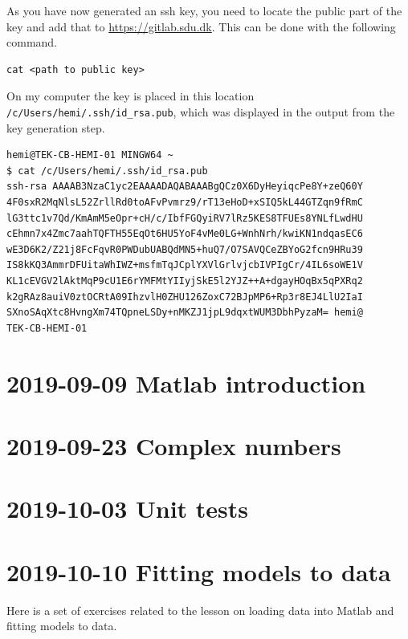 \documentclass[12pt,a4paper]{article}
\newcounter{ex}
\numberwithin{ex}{section}
\begin{document}
As you have now generated an ssh key, you need to locate the 
public part of the key and add that to \url{https://gitlab.sdu.dk}.
This can be done with the following command.
\begin{verbatim}
cat <path to public key>
\end{verbatim}

On my computer the key is placed in this location 
\verb!/c/Users/hemi/.ssh/id_rsa.pub!, which was displayed 
in the output from the key generation step.

\begin{verbatim}
hemi@TEK-CB-HEMI-01 MINGW64 ~
$ cat /c/Users/hemi/.ssh/id_rsa.pub
ssh-rsa AAAAB3NzaC1yc2EAAAADAQABAAABgQCz0X6DyHeyiqcPe8Y+zeQ60Y
4F0sxR2MqNlsL52ZrllRd0toAFvPvmrz9/rT13eHoD+xSIQ5kL44GTZqn9fRmC
lG3ttc1v7Qd/KmAmM5eOpr+cH/c/IbfFGQyiRV7lRz5KES8TFUEs8YNLfLwdHU
cEhmn7x4Zmc7aahTQFTH55EqOt6HU5YoF4vMe0LG+WnhNrh/kwiKN1ndqasEC6
wE3D6K2/Z21j8FcFqvR0PWDubUABQdMN5+huQ7/O7SAVQCeZBYoG2fcn9HRu39
IS8kKQ3AmmrDFUitaWhIWZ+msfmTqJCplYXVlGrlvjcbIVPIgCr/4IL6soWE1V
KL1cEVGV2lAktMqP9cU1E6rYMFMtYIIyjSkE5l2YJZ++A+dgayHOqBx5qPXRq2
k2gRAz8auiV0ztOCRtA09IhzvlH0ZHU126ZoxC72BJpMP6+Rp3r8EJ4LlU2IaI
SXnoSAqXtc8HvngXm74TQpneLSDy+nMKZJ1jpL9dqxtWUM3DbhPyzaM= hemi@
TEK-CB-HEMI-01
\end{verbatim}




\section{2019-09-09 Matlab introduction}

\section{2019-09-23 Complex numbers}


\section{2019-10-03 Unit tests}

\newpage
\section{2019-10-10 Fitting models to data}

Here is a set of exercises related to the lesson
on loading data into Matlab and fitting models to data.
\end{document}
